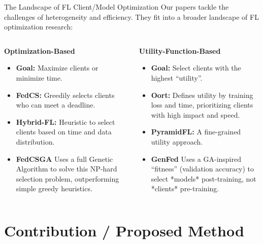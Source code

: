 \documentclass{beamer}
\begin{document}
\begin{frame}{The Landscape of FL Client/Model Optimization}
Our papers tackle the challenges of heterogeneity and efficiency. They fit into a broader landscape of FL optimization research:

\begin{columns}[T]
\begin{column}{0.5\textwidth}
\textbf{Optimization-Based}
\begin{itemize}
    \item \textbf{Goal:} Maximize clients or minimize time.
    \item \textbf{FedCS:} Greedily selects clients who can meet a deadline.
    \item \textbf{Hybrid-FL:} Heuristic to select clients based on time and data distribution.
    \item \textbf{FedCSGA} Uses a full Genetic Algorithm to solve this NP-hard selection problem, outperforming simple greedy heuristics.
\end{itemize}
\end{column}

\begin{column}{0.5\textwidth}
\textbf{Utility-Function-Based}
\begin{itemize}
    \item \textbf{Goal:} Select clients with the highest ``utility''.
    \item \textbf{Oort:} Defines utility by training loss and time, prioritizing clients with high impact and speed.
    \item \textbf{PyramidFL:} A fine-grained utility approach.
    \item \textbf{GenFed} Uses a GA-inspired ``fitness'' (validation accuracy) to select *models* post-training, not *clients* pre-training.
\end{itemize}
\end{column}
\end{columns}
\end{frame}

\section{Contribution / Proposed Method}
\end{document}
